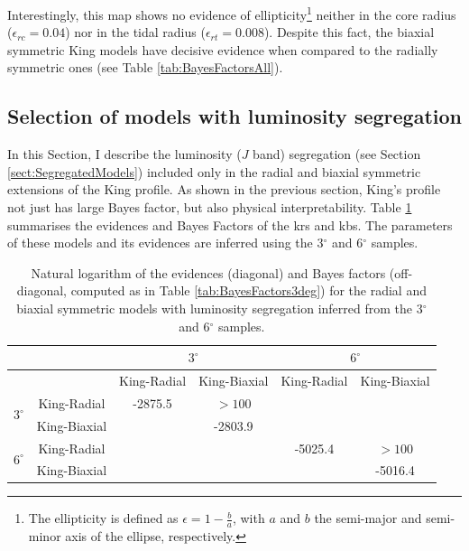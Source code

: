 Interestingly, this \gls{map} shows no evidence of ellipticity\footnote{The ellipticity is defined as $\epsilon = 1 - \frac{b}{a}$, with $a$ and $b$ the semi-major and semi-minor axis of the ellipse, respectively.} neither in the core radius ($\epsilon_{rc}= 0.04$) nor in the tidal radius ($\epsilon_{rt}= 0.008$). Despite this fact, the biaxial symmetric King models have decisive evidence when compared to the radially symmetric ones (see Table \ref{tab:BayesFactorsAll}).

\subsection{Selection of models with luminosity segregation}
\label{sect:lumsegregation}
In this Section, I describe the luminosity ($J$ band) segregation (see Section \ref{sect:SegregatedModels}) included only in the radial and biaxial symmetric extensions of the King profile. As shown in the previous section, King's profile not just has large Bayes factor, but also physical interpretability. Table \ref{tab:BayesFactorsLumSeg} summarises the evidences and Bayes Factors of the \gls{krs} and \gls{kbs}. The parameters of these models and its evidences are inferred using  the  3$^\circ$ and 6$^\circ$ samples.

\begin{table}[ht!]
  \centering
  \caption[]{Natural logarithm of the evidences (diagonal) and Bayes factors (off-diagonal, computed as in Table \ref{tab:BayesFactors3deg}) for the radial and biaxial symmetric models with luminosity segregation inferred from the 3$^\circ$ and 6$^\circ$ samples. }
  \label{tab:BayesFactorsLumSeg}
\begin{tabular}{cc|cc|cc}
\hline              
\hline              
&&  \multicolumn{2}{c}{$3^{\circ}$} &   \multicolumn{2}{c}{$6^{\circ}$} \\
\hline              
& & King-Radial& King-Biaxial &  King-Radial &  King-Biaxial \\
\hline              
\multirow{2}{*}{$3^{\circ}$}&King-Radial    &  -2875.5   &    $>100$       &           &            \\
&King-Biaxial &            &  -2803.9  &           &            \\
\hline
\multirow{2}{*}{$6^{\circ}$}& King-Radial    &            &           &   -5025.4 &    $>100$        \\
&King-Biaxial &&                     &           &  -5016.4   \\
\hline              
         \end{tabular}
   \end{table}

